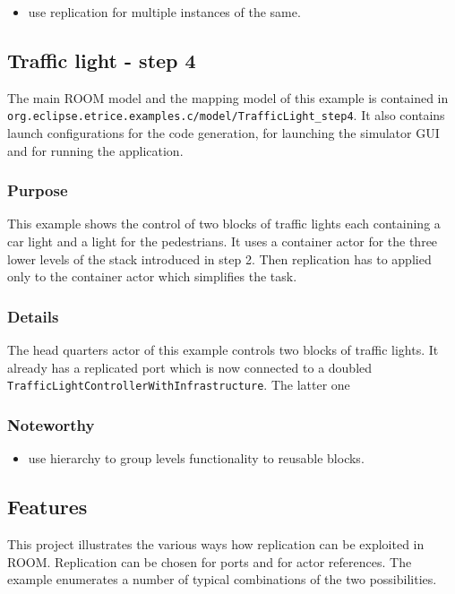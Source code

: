 \begin{itemize}
\item use replication for multiple instances of the same.
\end{itemize}


\subsection{Traffic light - step 4}

The main ROOM model and the mapping model of this example is contained
in \texttt{org.eclipse.etrice.examples.c/model/TrafficLight\_step4}.
It also contains launch configurations for the code generation, for
launching the simulator GUI and for
running the application.

\subsubsection{Purpose}

This example shows the control of two blocks of traffic lights
each containing a car light and a light for the pedestrians.
It uses a container actor for the three lower levels of the stack
introduced in step 2. Then replication has to applied only to the
container actor which simplifies the task.

\subsubsection{Details}

The head quarters actor of this example controls two blocks of traffic
lights. It already has a replicated port which is now connected
to a doubled \texttt{TrafficLightControllerWithInfrastructure}.
The latter one 

\subsubsection{Noteworthy}

\begin{itemize}
\item use hierarchy to group levels functionality to reusable blocks.
\end{itemize}

\subsection{Features}

This project illustrates the various ways how replication can be exploited in
ROOM. Replication can be chosen for ports and for actor references.
The example enumerates a number of typical combinations of the two
possibilities.

